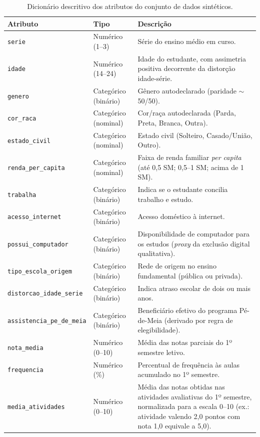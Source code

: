 \begin{apendicesenv}
\begin{table}[htb]
\centering
\caption{Dicionário descritivo dos atributos do conjunto de dados sintéticos.}
\label{tab:dicionario_atributos}
\small
\begin{tabular}{llp{6.4cm}}
\toprule
\textbf{Atributo} & \textbf{Tipo} & \textbf{Descrição} \\
\midrule
\texttt{serie} & Numérico (1--3) & Série do ensino médio em curso. \\
\texttt{idade} & Numérico (14--24) & Idade do estudante, com assimetria positiva decorrente da distorção idade-série. \\
\texttt{genero} & Categórico (binário) & Gênero autodeclarado (paridade $\sim$50/50). \\
\texttt{cor\_raca} & Categórico (nominal) & Cor/raça autodeclarada (Parda, Preta, Branca, Outra). \\
\texttt{estado\_civil} & Categórico (nominal) & Estado civil (Solteiro, Casado/União, Outro). \\
\texttt{renda\_per\_capita} & Categórico (nominal) & Faixa de renda familiar \textit{per capita} (até 0,5 SM; 0,5--1 SM; acima de 1 SM). \\
\texttt{trabalha} & Categórico (binário) & Indica se o estudante concilia trabalho e estudo. \\
\texttt{acesso\_internet} & Categórico (binário) & Acesso doméstico à internet. \\
\texttt{possui\_computador} & Categórico (binário) & Disponibilidade de computador para os estudos (\textit{proxy} da exclusão digital qualitativa). \\
\texttt{tipo\_escola\_origem} & Categórico (binário) & Rede de origem no ensino fundamental (pública ou privada). \\
\texttt{distorcao\_idade\_serie} & Categórico (binário) & Indica atraso escolar de dois ou mais anos. \\
\texttt{assistencia\_pe\_de\_meia} & Categórico (binário) & Beneficiário efetivo do programa Pé-de-Meia (derivado por regra de elegibilidade). \\
\texttt{nota\_media} & Numérico (0--10) & Média das notas parciais do 1º semestre letivo. \\
\texttt{frequencia} & Numérico (\%) & Percentual de frequência às aulas acumulado no 1º semestre. \\
\texttt{media\_atividades} & Numérico (0--10) & Média das notas obtidas nas atividades avaliativas do 1º semestre, normalizada para a escala 0--10 (ex.: atividade valendo 2,0 pontos com nota 1,0 equivale a 5,0). \\

\end{tabular}
\end{table}
\end{apendicesenv}
